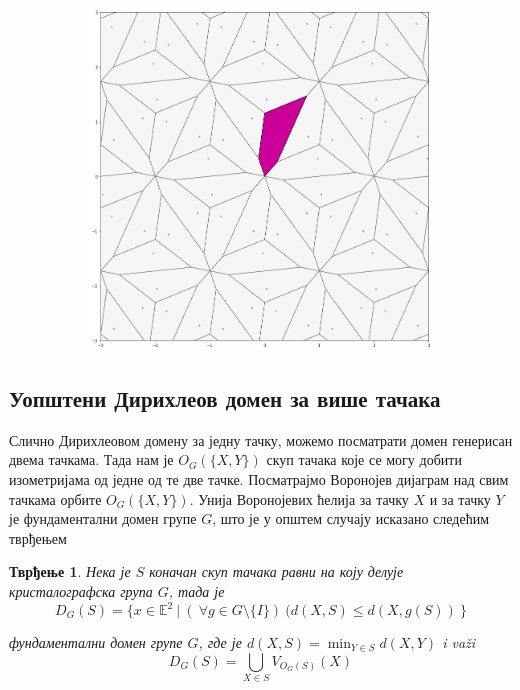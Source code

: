 \documentclass[12pt]{article}
\newtheorem{tvrdjenje}{\bf Тврђење}
\begin{document}
\begin{figure}[H]
\begin{subfigure}[b]{0.32\textwidth}
  \end{subfigure}
  \begin{subfigure}[b]{0.32\textwidth}
    \includegraphics[width=.9\textwidth]{dirihleov3.png}
    \label{fig:f3}
  \end{subfigure}
\end{figure}


    \subsection{Уопштени Дирихлеов домен за више тачака}\label{konstrukcija-dirihleove-fundamentalne-oblasti}
    
Слично Дирихлеовом домену за једну тачку,  можемо посматрати домен генерисан двема тачкама. Тада нам је  $O_G(\{X,Y\})$ скуп тачака које се могу добити изометријама од једне од те две тачке. Посматрајмо Воронојев дијаграм над свим тачкама орбите $O_G(\{X,Y\})$.  Унија Воронојевих ћелија за тачку $X$ и за тачку $Y$ је фундаментални домен групе $G$, што је у општем случају исказано следећим тврђењем
\begin{tvrdjenje}
Нека је $S$ коначан скуп тачака равни на коју делује кристалографска група $G$, тада је 
$$D_G(S) = \{x \in \mathbb{E}^2\:|\:(\:\forall g \in G \setminus \{I\})\:(d(X,S)\leq d(X,g(S))\:\}$$

фундаментални домен групе $G$, где је $d(X,S) = \min_{Y \in S} d(X,Y)$ i va\v zi 
$$D_G(S) = \bigcup_{X \in S} V_{O_G(S)}(X) $$ 
\end{tvrdjenje}
\end{document}
